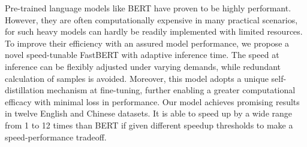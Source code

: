 Pre-trained language models like BERT have proven to be highly performant. However, they are often computationally expensive in many practical scenarios, for such heavy models can hardly be readily implemented with limited resources. To improve their efficiency with an assured model performance, we propose a novel speed-tunable FastBERT with adaptive inference time. The speed at inference can be flexibly adjusted under varying demands, while redundant calculation of samples is avoided. Moreover, this model adopts a unique self-distillation mechanism at fine-tuning, further enabling a greater computational efficacy with minimal loss in performance. Our model achieves promising results in twelve English and Chinese datasets. It is able to speed up by a wide range from 1 to 12 times than BERT if given different speedup thresholds to make a speed-performance tradeoff.
